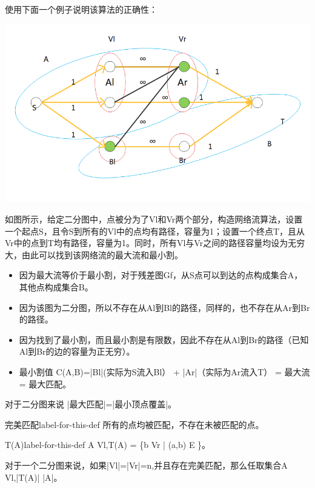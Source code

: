 使用下面一个例子说明该算法的正确性：\\
\centerline{\includegraphics[scale=0.6]{image/networkflow3.png}}
\begin{example}
  如图所示，给定二分图中，点被分为了Vl和Vr两个部分，构造网络流算法，设置一个起点S，且令S到所有的Vl中的点均有路径，容量为1；设置一个终点T，且从Vr中的点到T均有路径，容量为1。同时，所有Vl与Vr之间的路径容量均设为无穷大，由此可以找到该网络流的最大流和最小割。
\end{example}
\begin{itemize}
  \item 因为最大流等价于最小割，对于残差图Gf，从S点可以到达的点构成集合A，其他点构成集合B。
  \item 因为该图为二分图，所以不存在从Al到Bl的路径，同样的，也不存在从Ar到Br的路径。
  \item 因为找到了最小割，而且最小割是有限数，因此不存在从Al到Br的路径（已知Al到Br的边的容量为正无穷）。
  \item 最小割值 C(A,B)=|Bl|(实际为S流入Bl） + |Ar|（实际为Ar流入T） = 最大流 = 最大匹配。
\end{itemize}
对于二分图来说 |最大匹配|=|最小顶点覆盖|。

\begin{definition}{完美匹配}{label-for-this-def}
    所有的点均被匹配，不存在未被匹配的点。
\end{definition}

\begin{definition}{T(A)}{label-for-this-def}
  A \subseteq Vl,T(A) = \{b \in Vr | (a,b) \in E \}。
\end{definition}

对于一个二分图来说，如果|Vl|=|Vr|=n,并且存在完美匹配，那么任取集合A \subseteq Vl,|T(A)| \ge |A|。

